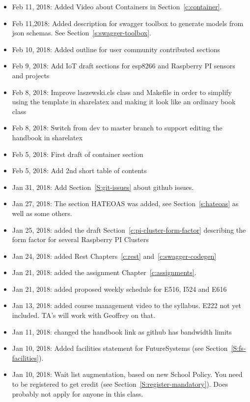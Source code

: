 \begin{itemize}
\item Feb 11, 2018: Added Video about Containers in
  Section~\ref{c:container}.


\item Feb 11,2018: Added description for swagger toolbox to generate
  models from json schemas. See Section~\ref{s:swagger-toolbox}.
\item Feb 10, 2018: Added outline for user community contributed
  sections
\item Feb 9, 2018: Add IoT draft sections for esp8266 and Raspberry PI
  sensors and projects
\item Feb 8, 2018: Improve laszewski.cls class and Makefile in order
  to simplify using the template in sharelatex and making it look like
  an ordinary book class
\item Feb 8, 2018: Switch from dev to master branch to support editing
  the handbook in sharelatex
\item Feb 5, 2018: First draft of container section
\item Feb 5, 2018: Add 2nd short table of contents
\item Jan 31, 2018: Add Section~\ref{S:git-issues} about github issues.
\item Jan 27, 2018: The section HATEOAS was added, see
  Section~\ref{s:hateoas} as well as some others.
\item Jan 25, 2018: added the draft
  Section~\ref{c:pi-cluster-form-factor} describing the form factor
  for several Raspberry PI Clusters

\item Jan 24, 2018: added Rest Chapters~\ref{c:rest}
  and~\ref{c:swagger-codegen}

\item Jan 21, 2018: added the assignment Chapter~\ref{c:assignments}.

\item Jan 21, 2018: added proposed weekly schedule for E516, I524 and
  E616

\item Jan 13, 2018: added course management video to the
  syllabus. E222 not yet included. TA's will work with Geoffrey on
  that.

\item Jan 11, 2018: changed the handbook link as github has bandwidth
  limits

\item Jan 10, 2018: Added facilities statement for FutureSystems (see
  Section~\ref{S:fs-facilities}).

\item Jan 10, 2018: Wait list augmentation, based on new School
  Policy. You need to be registered to get credit (see
  Section~\ref{S:register-mandatory}). Does probably not apply for
  anyone in this class.

\end{itemize}
